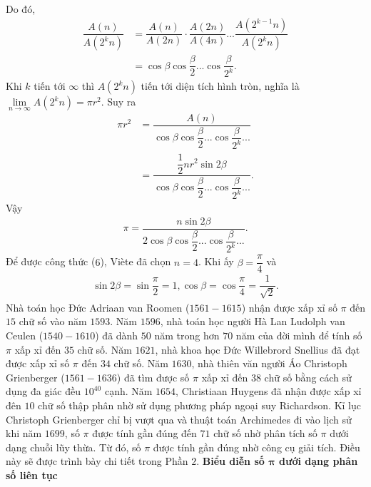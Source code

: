 \begin{multicols}{2}
\begin{align*}
	\end{align*}
	Do đó,
	\begin{align*}
			\dfrac{{A(n)}}{{A({2^k}n)}} &= \dfrac{{A(n)}}{{A(2n)}}\cdot\dfrac{{A(2n)}}{{A(4n)}}...\dfrac{{A\left( {{2^{k - 1}}n} \right)}}{{A({2^k}n)}}\\
			&= \cos \beta \cos \dfrac{\beta }{2}...\cos \dfrac{\beta }{{{2^k}}}.
	\end{align*}
	Khi $k$  tiến tới $\infty$  thì $A({2^k}n)$  tiến tới diện tích hình tròn, nghĩa là $\mathop {\lim }\limits_{n \to \infty } A({2^k}n) = \pi {r^2}.$ Suy ra  
	\begin{align*}
		\pi {r^2} &= \dfrac{{A(n)}}{{\cos \beta \cos \dfrac{\beta }{2}...\cos \dfrac{\beta }{{{2^k}}}...}} \\
		&= \dfrac{{\dfrac{1}{2}n{r^2}\sin 2\beta }}{{\cos \beta \cos \dfrac{\beta }{2}...\cos \dfrac{\beta }{{{2^k}}}...}}.
	\end{align*}
	Vậy  
	\begin{align*}
		\pi  = \dfrac{{n\sin 2\beta }}{{2\cos \beta \cos \dfrac{\beta }{2}...\cos \dfrac{\beta }{{{2^k}}}...}}.
	\end{align*}
	Để được công thức ($6$), Viète đã chọn $n = 4$. Khi ấy $\beta  = \dfrac{\pi }{4}$  và 
	\begin{align*}
		\sin 2\beta  = \sin \dfrac{\pi }{2} = 1, \cos \beta  = \cos \dfrac{\pi }{4} = \dfrac{1}{{\sqrt 2 }}.
	\end{align*}
	Nhà toán học Đức Adriaan van Roomen ($1561-1615$) nhận được xấp xỉ số  $\pi$ đến $15$ chữ số vào năm $1593$.
	\vskip 0.1cm 
	Năm $1596$, nhà toán học người Hà Lan Ludolph van Ceulen ($1540-1610$) đã dành $50$ năm trong hơn $70$ năm của đời mình để tính số $\pi$   xấp xỉ đến $35$ chữ số.
	\vskip 0.1cm 
	Năm $1621$, nhà khoa học Đức Willebrord Snellius đã đạt được xấp xỉ số $\pi$  đến $34$ chữ số.
	\vskip 0.1cm
	Năm $1630$, nhà thiên văn người Áo Christoph Grienberger ($1561-1636$) đã tìm được số $\pi$ xấp xỉ đến $38$ chữ số bằng cách sử dụng đa giác đều  $10^{40}$ cạnh.
	\vskip 0.1cm 
	Năm $1654$, Christiaan Huygens đã nhận được xấp xỉ đên $10$ chữ số thập phân nhờ sử dụng phương pháp ngoại suy Richardson.  
	\vskip 0.1cm
	Kỉ lục Christoph Grienberger chỉ bị vượt qua và thuật toán Archimedes đi vào lịch sử khi năm $1699$, số  $\pi$ được tính gần đúng đến $71$ chữ số nhờ phân tích số  $\pi$ dưới dạng chuỗi lũy thừa. Từ đó, số $\pi$ được tính gần đúng nhờ công cụ giải tích. Điều này sẽ được trình bày chi tiết trong Phần $2$.
	\vskip 0.1cm 
	\textbf{\color{lichsutoanhoc}Biểu diễn số $\pmb{\pi}$  dưới dạng phân số liên tục}

\end{multicols}
